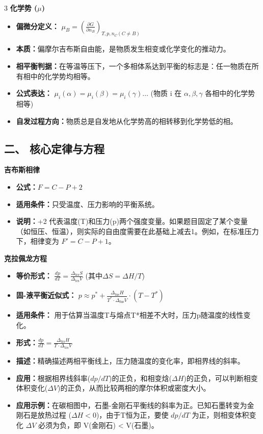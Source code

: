 \documentclass[a4paper,6pt]{article} %
\begin{document}
\begin{multicols}{3}
\textbf{化学势 ($\mu$)}
\begin{itemize}
    \item \textbf{偏微分定义：} $\mu_B = \left(\frac{\partial G}{\partial n_B}\right)_{T,p,n_C (C\neq B)}$
    \item \textbf{本质：}偏摩尔吉布斯自由能，是物质发生相变或化学变化的推动力。
    \item \textbf{相平衡判据：}在等温等压下，一个多相体系达到平衡的标志是：任一物质在所有相中的化学势均相等。
    \item \textbf{公式表达：} $\mu_i(\alpha) = \mu_i(\beta) = \mu_i(\gamma) \dots$ (物质 i 在 $\alpha, \beta, \gamma$ 各相中的化学势相等)
    \item \textbf{自发过程方向：}物质总是自发地从化学势高的相转移到化学势低的相。
\end{itemize}

\subsection*{二、 核心定律与方程}
\textbf{吉布斯相律}
\begin{itemize}
    \item \textbf{公式：}$F = C - P + 2$
    \item \textbf{适用条件：}只受温度、压力影响的平衡系统。
    \item \textbf{说明：}+2 代表温度(T)和压力(p)两个强度变量。如果题目固定了某个变量（如恒压、恒温），则实际的自由度需要在此基础上减去1。例如，在标准压力下，相律变为 $F' = C - P + 1$。
\end{itemize}

\textbf{克拉佩龙方程}
\begin{itemize}
    \item \textbf{等价形式：} $\frac{dp}{dT} = \frac{\Delta_{\text{trs}}S}{\Delta_{\text{trs}}V}$ (其中$\Delta S = \Delta H/T$)
    \item \textbf{固-液平衡近似式：} $p \approx p^* + \frac{\Delta_{\text{fus}}H}{T^* \cdot \Delta_{\text{fus}}V} \cdot (T - T^*)$
    \item \textbf{适用条件：} 用于估算当温度T与熔点T*相差不大时，压力p随温度的线性变化。
    \item \textbf{形式：}$\frac{dp}{dT} = \frac{\Delta_{\text{trs}}H}{T \cdot \Delta_{\text{trs}}V}$
    \item \textbf{描述：}精确描述两相平衡线上，压力随温度的变化率，即相界线的斜率。
    \item \textbf{应用：}根据相界线斜率($dp/dT$)的正负，和相变焓($\Delta H$)的正负，可以判断相变体积变化($\Delta V$)的正负，从而比较两相的摩尔体积或密度大小。
    \item \textbf{应用示例：}在碳相图中，石墨-金刚石平衡线的斜率为正。已知石墨转变为金刚石是放热过程 ($\Delta H < 0$)，由于T恒为正，要使 $dp/dT$ 为正，则相变体积变化 $\Delta V$ 必须为负，即 V(金刚石) < V(石墨)。
\end{itemize}


\end{multicols}
\end{document}
